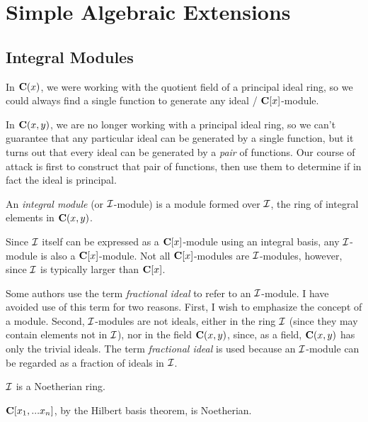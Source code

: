 
\setcounter{chapter}{8}
\chapter{Simple Algebraic Extensions}



\section{Integral Modules}

In ${\bf C}(x)$, we were working with the quotient field of a
principal ideal ring, so we could always find a single function to
generate any ideal / ${\bf C}[x]$-module.

In ${\bf C}(x,y)$, we are no longer working with a principal ideal
ring, so we can't guarantee that any particular ideal can be generated
by a single function, but it turns out that every ideal can be
generated by a {\it pair} of functions.  Our course of attack is first
to construct that pair of functions, then use them to determine if in
fact the ideal is principal.


An {\it integral module} (or ${\cal I}$-module) is a module formed
over ${\cal I}$, the ring of integral elements in ${\bf C}(x,y)$.

\enddefinition

Since ${\cal I}$ itself can be expressed as a ${\bf C}[x]$-module
using an integral basis, any ${\cal I}$-module is also a ${\bf
C}[x]$-module.  Not all ${\bf C}[x]$-modules are ${\cal I}$-modules,
however, since ${\cal I}$ is typically larger than ${\bf C}[x]$.

Some authors use the term {\it fractional ideal} to refer to an ${\cal
I}$-module.  I have avoided use of this term for two reasons.  First,
I wish to emphasize the concept of a module.  Second, ${\cal
I}$-modules are not ideals, either in the ring ${\cal I}$ (since they
may contain elements not in ${\cal I}$), nor in the field ${\bf
C}(x,y)$, since, as a field, ${\bf C}(x,y)$ has only the trivial
ideals.  The term {\it fractional ideal} is used because an ${\cal
I}$-module can be regarded as a fraction of ideals in ${\cal I}$.

\theorem ${\cal I}$ is a Noetherian ring.
\label{I is Noetherian}

\proof

${\bf C}[x_1, ... x_n]$, by the Hilbert basis theorem, is Noetherian.

